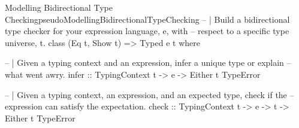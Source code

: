\begin{pseudohaskell}{Modelling Bidirectional Type Checking}{pseudoModellingBidirectionalTypeChecking}
-- | Build a bidirectional type checker for your expression language, e, with
--   respect to a specific type universe, t.
class (Eq t, Show t) => Typed e t where
  
  -- | Given a typing context and an expression, infer a unique type or explain
  --   what went awry.
  infer :: TypingContext t -> e -> Either t TypeError

  -- | Given a typing context, an expression, and an expected type, check if the
  --   expression can satisfy the expectation.
  check :: TypingContext t -> e -> t -> Either t TypeError
\end{pseudohaskell}







